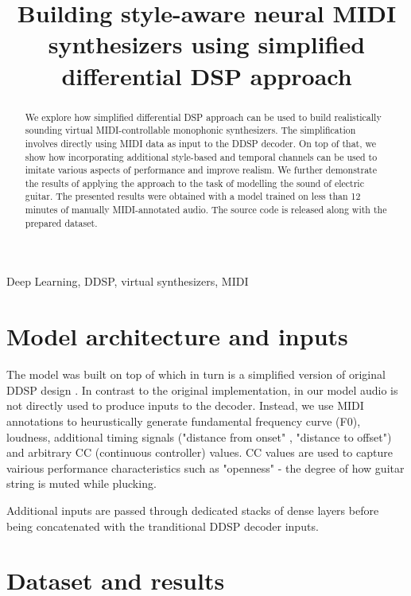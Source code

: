 \documentclass{article}
\title{Building style-aware neural MIDI synthesizers using simplified differential DSP approach}
\begin{document}
\tenpt
\maketitle

\begin{sloppy}
\begin{abstract}
We explore how simplified differential DSP approach can be used to build realistically sounding virtual MIDI-controllable monophonic synthesizers. The simplification involves directly using  MIDI data as input to the DDSP decoder. On top of that, we show how  incorporating additional style-based and temporal channels can be used to imitate various aspects of performance and improve realism.  We further demonstrate the results of applying the approach to the task of modelling the sound of electric guitar. The presented results were obtained with a model trained on less than 12 minutes of manually MIDI-annotated audio. The source code is released along with the prepared dataset.
\end{abstract}

\begin{keywords}
Deep Learning, DDSP, virtual synthesizers, MIDI
\end{keywords}

\section{Model architecture and inputs}
\label{sec:architecture_and_inputs}

The model was built on top of \cite{ddsp_simplified_repo} which in turn is a simplified version of original DDSP design \cite{ddsp}. In contrast to the original implementation, in our model audio is not directly used to produce inputs to the decoder. 
Instead, we use MIDI annotations to heurustically generate fundamental frequency curve (F0), loudness, additional timing signals ("distance from onset" , "distance to offset") and arbitrary CC (continuous controller) values. CC values are used to capture vairious performance characteristics such as "openness" - the degree of how guitar string is muted while plucking.

Additional inputs are passed through dedicated stacks of dense layers before being concatenated with the tranditional DDSP decoder inputs.

\section{Dataset and results}
\label{sec:dataset_and_results}


\end{sloppy}
\end{document}

